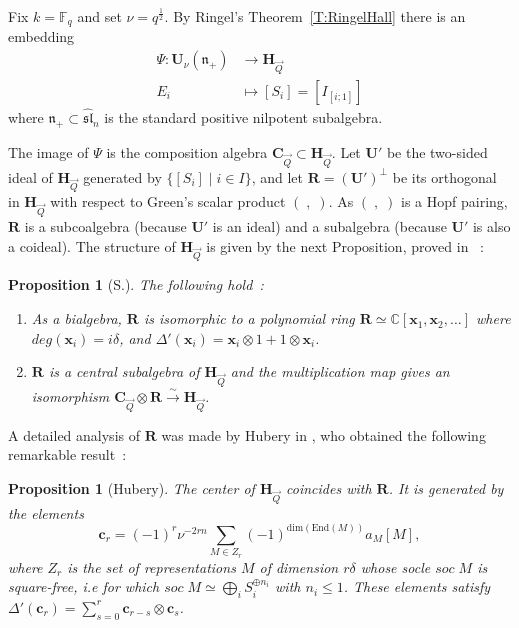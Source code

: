 \documentclass[a4paper,10pt]{amsart}
\def\H{\mathbf{H}}
\def\U{\mathbf{U}}
\def\C{\mathbb{C}}
\def\n{\mathfrak{n}}
\newtheorem{prop}[theo]{Proposition}
\numberwithin{equation}{section}
\begin{document}
\vspace{.2in}

Fix $k=\mathbb{F}_q$ and set $\nu=q^{\frac{1}{2}}$. By Ringel's Theorem~\ref{T:RingelHall} there is an embedding
\begin{align*}
\Psi: \U_{\nu}(\n_+) &\to \H_{\vec{Q}}\\
E_i &\mapsto [S_i]=[I_{[i;1]}]
\end{align*}
where $\n_+ \subset \widehat{\mathfrak{sl}}_n$ is the standard positive nilpotent subalgebra.

\vspace{.05in}

The image of $\Psi$ is the composition algebra $\mathbf{C}_{\vec{Q}} \subset \H_{\vec{Q}}$.
Let $\U'$ be the two-sided ideal of $\H_{\vec{Q}}$ generated by $\{[S_i]\;|\;i \in I\}$, and let $\mathbf{R}=(\U')^{\perp}$ be its orthogonal in $\H_{\vec{Q}}$ with respect to Green's scalar product $(\;,\;)$. As $(\;,\;)$ is a Hopf pairing, $\mathbf{R}$ is a subcoalgebra (because $\U'$ is an ideal) and a subalgebra (because $\U'$ is also a coideal).
The structure of $\H_{\vec{Q}}$ is given by the next Proposition, proved in \cite{S1}~:

\vspace{.1in}

\begin{prop}[S.]\label{P:Hallcyclic} The following hold~:
\begin{enumerate}
\item[i)] As a bialgebra, $\mathbf{R}$ is isomorphic to a polynomial ring $\mathbf{R}\simeq \C[\mathbf{x}_1, \mathbf{x}_2, \ldots]$ where $deg(\mathbf{x}_i)=i\delta$, and $\Delta'(\mathbf{x}_{i})=\mathbf{x}_i \otimes 1 + 1 \otimes \mathbf{x}_i$.
\item[ii)] $\mathbf{R}$ is a central subalgebra of $\H_{\vec{Q}}$ and the multiplication map gives an isomorphism $\mathbf{C}_{\vec{Q}} \otimes \mathbf{R} \stackrel{\sim}{\to} \H_{\vec{Q}}$.
\end{enumerate}
\end{prop}

\vspace{.1in}

A detailed analysis of $\mathbf{R}$ was made by Hubery in \cite{HuberyR}, who obtained the following remarkable result~:

\vspace{.1in}

\begin{prop}[Hubery]\label{P:HuberyR} The center of $\H_{\vec{Q}}$ coincides with $\mathbf{R}$. It is generated by the elements
$$\mathbf{c}_r=(-1)^r\nu^{-2rn}\sum_{M \in Z_r} (-1)^{\text{dim}(\text{End}(M))} a_M[M],$$
where $Z_r$ is the set of representations $M$ of dimension $r\delta$ whose socle $soc\;M$ is square-free, i.e for which $soc\;M \simeq \bigoplus_i S_i^{\oplus n_i}$ with $n_i \leq 1$. These elements
satisfy $\Delta'(\mathbf{c}_r)=\sum_{s=0}^r \mathbf{c}_{r-s} \otimes \mathbf{c}_s$.
\end{prop}
\end{document}
